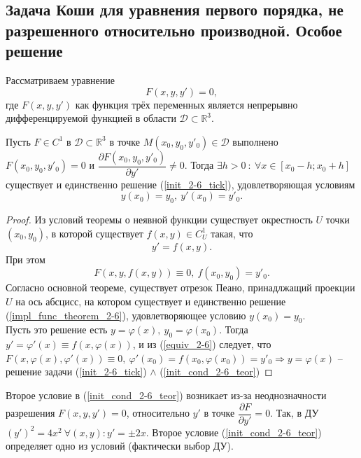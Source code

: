 \subsection{Задача Коши для уравнения первого порядка, не разрешенного относительно производной. Особое решение}
Рассматриваем уравнение
\begin{equation}\label{init_2-6_tick}
	F(x, y, y') = 0,
\end{equation}
где $F(x, y, y')$ как функция трёх переменных является непрерывно дифференцируемой функцией в области $\mathcal{D} \subset \mathbb{R}^3$.
\begin{theorem}
	Пусть $F \in C^1$ в $\mathcal{D} \subset \mathbb{R}^3$ в точке $M(x_0, y_0, y'_0) \in \mathcal{D}$ выполнено $F(x_0, y_0, y'_0) = 0$ и $\dfrac{\partial F(x_0, y_0, y'_0)}{\partial y'} \neq 0$. Тогда $\exists h > 0\ : \ \forall x \in [x_0 - h; x_0 + h]$ существует и единственно решение (\ref{init_2-6_tick}), удовлетворяющая условиям
\begin{equation}\label{init_cond_2-6_teor}
	y(x_0) = y_0,\ y'(x_0) = y'_0.
\end{equation}		
\end{theorem}
\begin{proof}
	Из условий теоремы о неявной функции существует окрестность $U$ точки $(x_0, y_0)$, в которой существует $f(x, y) \in C^1_U$ такая, что
	\begin{equation}\label{impl_func_theorem_2-6}
		y' = f(x, y).
	\end{equation}
	При этом
	\begin{equation} \label{equiv_2-6}
		F(x, y, f(x, y)) \equiv 0,\ f(x_0, y_0) = y'_0.
	\end{equation}
	Согласно основной теореме, существует отрезок Пеано, принадлжащий проекции $U$ на ось абсцисс, на котором существует и единственно решение (\ref{impl_func_theorem_2-6}), удовлетворяющее условию $y(x_0) = y_0$.\\
	Пусть это решение есть $y = \varphi(x),\ y_0 = \varphi(x_0)$. Тогда $y' = \varphi'(x) \equiv f (x, \varphi(x))$, и из (\ref{equiv_2-6}) следует, что $F(x, \varphi(x), \varphi'(x)) \equiv 0,\ \varphi'(x_0) = f(x_0, \varphi(x_0)) = y'_0 \Rightarrow y = \varphi(x)$ -- решение задачи (\ref{init_2-6_tick}) $\wedge$ (\ref{init_cond_2-6_teor})
\end{proof}
\begin{remark}
	Второе условие в (\ref{init_cond_2-6_teor}) возникает из-за неоднозначности разрешения $F(x, y, y') = 0$, относительно $y'$ в точке $\dfrac{\partial F}{\partial y'} = 0$. Так, в ДУ $(y')^2 = 4x^2\ \forall(x, y) : y' = \pm2x$. Второе условие (\ref{init_cond_2-6_teor}) определяет одно из условий (фактически выбор ДУ).
\end{remark} 

